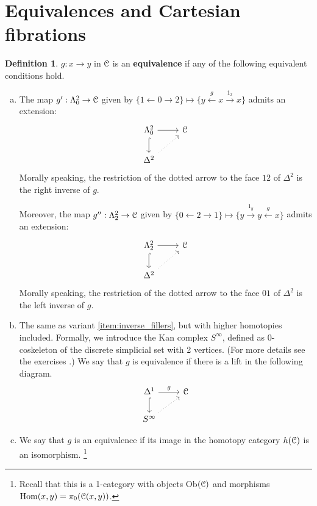 \documentclass[10pt,a4paper,reqno,oneside]{book} %
\theoremstyle{plain}
\theoremstyle{definition}
\newtheorem{defin}[thm]{Definition}
\theoremstyle{remark}
\numberwithin{equation}{section}
\begin{document}
\section{Equivalences and Cartesian fibrations}
\label{sect:cartesian}

\begin{defin}
$g : x \to y$ in $\mathcal C$ is an \textbf{equivalence} if any of the following equivalent conditions hold.
\begin{enumerate}[(a)]
\item \label{item:inverse_fillers}
The map $g': \Lambda_0^2 \to \mathcal C$ given by $\{1 \leftarrow 0 \rightarrow 2\} \mapsto \{y \overset{g}{\leftarrow} x 
\overset{1_x}{\rightarrow} x\}$ admits an extension:
\[
\begin{tikzcd}
\Lambda^2_0 \arrow{r}\arrow[hook]{d} & \cC \\
\Delta^2 \arrow[dotted]{ur} & 
\end{tikzcd}
\]
Morally speaking, the restriction of the dotted arrow to the face $12$ of $\Delta^2$ is the right inverse of $g$.

Moreover, the map $g'': \Lambda_2^2 \to \mathcal C$ given by $\{0 \leftarrow 2 \rightarrow 1\} \mapsto \{y \overset{1_y}{\rightarrow} y 
\overset{g}{\leftarrow} x\}$ admits an extension:
\[
\begin{tikzcd}
\Lambda^2_2 \arrow{r}\arrow[hook]{d} & \cC \\
\Delta^2 \arrow[dotted]{ur} & 
\end{tikzcd}
\]
Morally speaking, the restriction of the dotted arrow to the face $01$ of $\Delta^2$ is the left inverse of $g$.

\item \label{item:infinity_sphere}
The same as variant \ref{item:inverse_fillers}, but with higher homotopies included. Formally, we introduce the
Kan complex $S^{\infty}$, defined as 0-coskeleton of the discrete simplicial set with 2 vertices. (For more details see
the exercises \cite{Mauro_Exercises}.)
We say that $g$ is equivalence if there is a lift in the following diagram.
\[
\begin{tikzcd}
\Delta^1 \arrow{r}{g}\arrow[hook]{d} & \cC \\
S^{\infty}\arrow[dotted]{ur} & 
\end{tikzcd}
\]

\item \label{item:iso_homcat}
We say that $g$ is an equivalence if its image in the homotopy category $h(\mathcal C)$ is an isomorphism.
\footnote{Recall that this is a 1-category with objects Ob$(\mathcal C)$ and morphisms $\operatorname{Hom}(x,y) = \pi_0(\mathcal C(x,y))$.}
\end{enumerate}
\end{defin}
\end{document}
